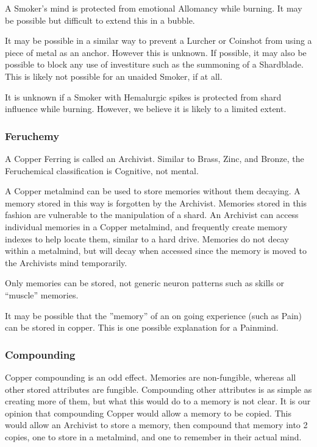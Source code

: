 \documentclass[conference]{IEEEtran}
\begin{document}
A Smoker's mind is protected from emotional Allomancy while burning.\cite{TFE-CH7}  It may be possible but difficult to extend this in a bubble.\cite{emo-cloud}

It may be possible in a similar way to prevent a Lurcher or Coinshot from using a piece of metal as an anchor.  However this is unknown.  If possible, it may also be possible to block any use of investiture such as the summoning of a Shardblade.\cite{rythm-block}\cite{emo-cloud}\cite{ARS} This is likely not possible for an unaided Smoker, if at all.

It is unknown if a Smoker with Hemalurgic spikes is protected from shard influence while burning.  However, we believe it is likely to a limited extent.\\
\subsubsection*{\textbf{Feruchemy}}
A Copper Ferring is called an Archivist.\cite{ARS}  Similar to Brass, Zinc, and Bronze, the Feruchemical classification is Cognitive, not mental.\cite{FE-TB} 

A Copper metalmind can be used to store memories without them decaying.  A memory stored in this way is forgotten by the Archivist.\cite{ARS}  Memories stored in this fashion are vulnerable to the manipulation of a shard.\cite{WoA-EP}  An Archivist can access individual memories in a Copper metalmind,\cite{copper-ia} and frequently create memory indexes\cite{WoA-CH4} to help locate them, similar to a hard drive.
Memories do not decay within a metalmind, but will decay when accessed since the memory is moved to the Archivists mind temporarily.\cite{WoA-CH15}

Only memories can be stored, not generic neuron patterns such as skills or ``muscle'' memories.\cite{copper-no-mm}

It may be possible that the ''memory'' of an on going experience (such as Pain) can be stored in copper.  This is one possible explanation for a Painmind.\cite{TLM-CH34}\\
\newpage
\subsubsection*{\textbf{Compounding}}
Copper compounding is an odd effect.  Memories are non-fungible, whereas all other stored attributes are fungible.  Compounding other attributes is as simple as creating more of them, but what this would do to a memory is not clear.  It is our opinion that compounding Copper would allow a memory to be copied.  This would allow an Archivist to store a memory, then compound that memory into 2 copies, one to store in a metalmind, and one to remember in their actual mind.\\
\end{document}
